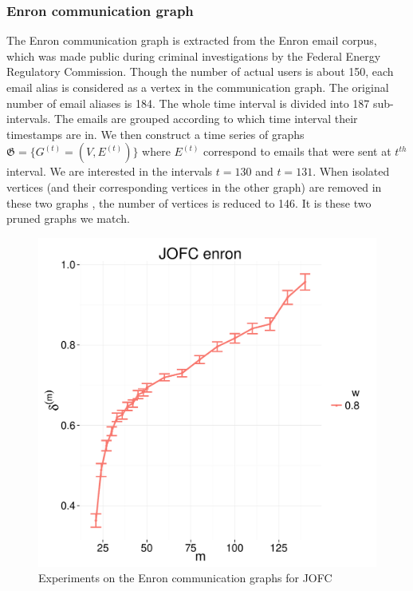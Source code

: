 \documentclass[12pt,oneside,final]{thesis}\usepackage[]{graphicx}\usepackage[]{color}
\begin{document}
\subsubsection{Enron communication graph}
The Enron communication graph is extracted from the  Enron  email corpus, which was made public during criminal investigations by the  Federal Energy Regulatory Commission. Though the number of actual users is about 150,  each email alias is considered as a vertex in the communication graph. The original number of email aliases is 184. The whole time interval is divided into 187 sub-intervals. The emails are grouped according to which time interval their timestamps are in. We then construct a time series of graphs $\mathfrak{G}=\{G^{(t)} = (V,E^{(t)})\}$ where $E^{(t)}$ correspond to emails that were sent at $t^{th}$ interval. We are interested in the intervals $t=130$  and $t=131$. When isolated vertices (and their corresponding vertices in the other graph) are removed in these two graphs  , the number of vertices is reduced to 146. It is these two pruned graphs we match.

\begin{figure}
\includegraphics[scale=0.75]{JOFC-enron_dim_20}
\caption{Experiments on the Enron communication graphs for JOFC \label{enron_graphmatch}}
\end{figure}
\end{document}
